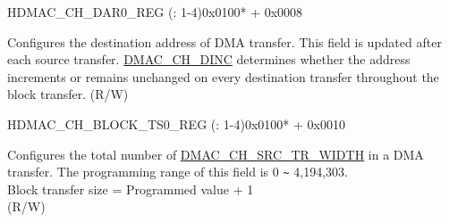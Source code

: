 \begin{register}{H}{DMAC\_CH\_DAR0\_REG (: 1-4)}{0x0100* + 0x0008}\label{regdesc:DMACCHNDAR0REG}
%
\regnewline%
\begin{regdesc}\begin{reglist}
\label{fielddesc:DMACCHNDAR0}\item [DMAC\_CH\regindex{n}\_DAR0] Configures the destination address of DMA transfer. This field is updated after each source transfer. \hyperref[fielddesc:DMACCHNDINC]{DMAC\_CH\_DINC} determines whether the address increments or remains unchanged on every destination transfer throughout the block transfer. (R/W)
\end{reglist}\end{regdesc}
\end{register}

\begin{register}{H}{DMAC\_CH\_BLOCK\_TS0\_REG (: 1-4)}{0x0100* + 0x0010}\label{regdesc:DMACCHNBLOCKTS0REG}
%
%
\regnewline%
\begin{regdesc}\begin{reglist}
\label{fielddesc:DMACCHNBLOCKTS}\item [DMAC\_CH\regindex{n}\_BLOCK\_TS] Configures the total number of \hyperref[fielddesc:DMACCHNSRCTRWIDTH]{DMAC\_CH\_SRC\_TR\_WIDTH} in a DMA transfer. The programming range of this field is 0 \verb+~+ 4,194,303.\\
Block transfer size = Programmed value + 1 \\
(R/W)
\end{reglist}\end{regdesc}
\end{register}

